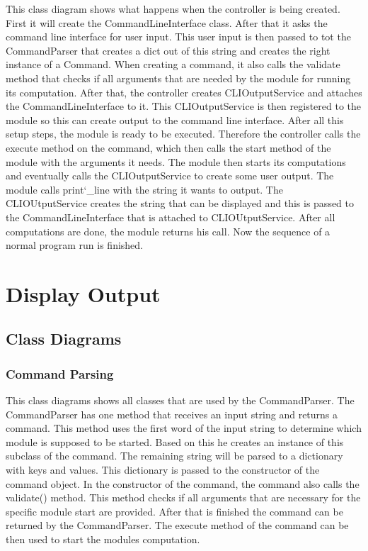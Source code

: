 \documentclass[parskip=full]{scrartcl}
\begin{document}
This class diagram shows what happens when the controller is being created.
First it will create the CommandLineInterface class.
After that it asks the command line interface for user input.
This user input is then passed to tot the CommandParser that creates a dict out of this string and creates the right instance of a Command.
When creating a command, it also calls the validate method that checks if all arguments that are needed by the module for running its computation.
After that, the controller creates CLIOutputService and attaches the CommandLineInterface to it.
This CLIOutputService is then registered to the module so this can create output to the command line interface.
After all this setup steps, the module is ready to be executed.
Therefore the controller calls the execute method on the command, which then calls the start method of the module with the arguments it needs.
The module then starts its computations and eventually calls the CLIOutputService to create some user output.
The module calls print\char`_line with the string it wants to output.
The CLIOUtputService creates the string that can be displayed and this is passed to the CommandLineInterface that is attached to CLIOUtputService.
After all computations are done, the module returns his call.
Now the sequence of a normal program run is finished.

\section{Display Output}

\subsection{Class Diagrams}

\subsubsection{Command Parsing}



This class diagrams shows all classes that are used by the CommandParser.
The CommandParser has one method that receives an input string and returns a command.
This method uses the first word of the input string to determine which module is supposed to be started.
Based on this he creates an instance of this subclass of the command.
The remaining string will be parsed to a dictionary with keys and values. 
This dictionary is passed to the constructor of the command object.
In the constructor of the command, the command also calls the validate() method.
This method checks if all arguments that are necessary for the specific module start are provided.
After that is finished the command can be returned by the CommandParser.
The execute method of the command can be then used to start the modules computation.
\end{document}
